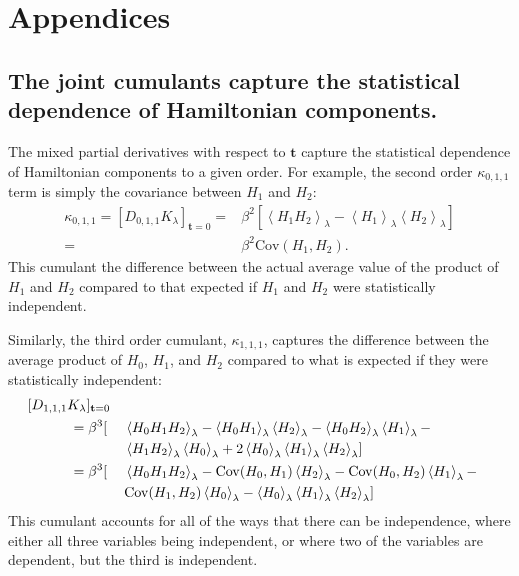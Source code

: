 \documentclass{article}
\let\vec\mathbf
\begin{document}
\section*{Appendices}
\begin{appendices}
\section{The joint cumulants capture the statistical dependence of Hamiltonian components.}
\label{app:jointCumulants}

The mixed partial derivatives with respect to $\vec t$ capture the statistical dependence of Hamiltonian components to a given order. For example, the second order $\kappa_{0,1,1}$ term is simply the covariance between $H_1$ and $H_2$:
\begin{align}
\kappa_{0, 1, 1} = [D_{0, 1, 1} K_\lambda]_{\vec t=0} =&
	\beta^2 \left[
    	\left\langle H_1 H_2 \right\rangle_\lambda -
		\left\langle H_1 \right\rangle_\lambda 
		\left\langle H_2 \right\rangle_\lambda
    \right] \nonumber\\
    =&
    \beta^2 \mathrm{Cov}(H_1,H_2).              
\end{align}
This cumulant the difference between the actual average value of the product of $H_1$ and $H_2$ compared to that expected if $H_1$ and $H_2$ were statistically independent.

Similarly, the third order cumulant, $\kappa_{1,1,1}$, captures the difference between the average product of $H_0$, $H_1$, and $H_2$ compared to what is expected if they were statistically independent:
\begin{alignat}{3}
\MoveEqLeft[3] [D_{1, 1, 1} K_\lambda]_{\vec t=0}\notag\\
&= \beta^3[ &&
\left\langle H_0 H_1 H_2 \right\rangle_\lambda -
\left\langle H_0 H_1 \right\rangle_\lambda
	\left\langle H_2 \right\rangle_\lambda -
\left\langle H_0 H_2 \right\rangle_\lambda
	\left\langle H_1 \right\rangle_\lambda - \notag\\
&&& \left\langle H_1 H_2 \right\rangle_\lambda
	\left\langle H_0 \right\rangle_\lambda +
2 \left\langle H_0 \right\rangle_\lambda
	\left\langle H_1 \right\rangle_\lambda
	\left\langle H_2 \right\rangle_\lambda]\notag\\
&= \beta^3[ &&
	\left\langle H_0 H_1 H_2 \right\rangle_\lambda -
	\mathrm{Cov}(H_0,H_1) \left\langle H_2 \right\rangle_\lambda -
	\mathrm{Cov}(H_0,H_2) \left\langle H_1 \right\rangle_\lambda -\\
	&&& \mathrm{Cov}(H_1,H_2) \left\langle H_0 \right\rangle_\lambda -
	\left\langle H_0 \right\rangle_\lambda
		\left\langle H_1 \right\rangle_\lambda
		\left\langle H_2 \right\rangle_\lambda]        
\end{alignat}
This cumulant accounts for all of the ways that there can be independence, where either all three variables being independent, or where two of the variables are dependent, but the third is independent.


\end{appendices}
\end{document}
